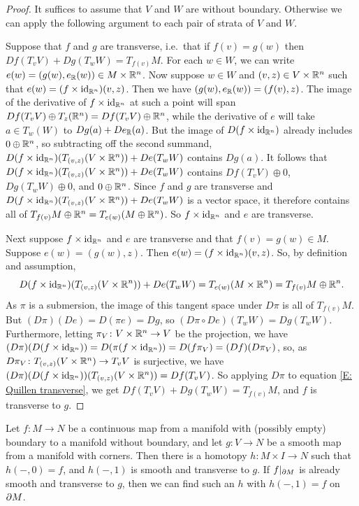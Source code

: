 \begin{proof}
	It suffices to assume that $V$ and $W$ are without boundary.
	Otherwise we can apply the following argument to each pair of strata of $V$ and $W$.

	Suppose that $f$ and $g$ are transverse, i.e.\ that if $f(v)=g(w)$ then $Df(T_vV)+Dg(T_wW)=T_{f(v)}M$.
	For each $w\in W$, we can write $e(w)=(g(w),e_{\mathbb{R}}(w))\in M\times \mathbb{R}^n$.
	Now suppose $w\in W$ and $(v,z)\in V\times \mathbb{R}^n$ such that $e(w)=(f\times\mathrm{id}_{\mathbb{R}^n})(v,z)$.
	Then we have $(g(w),e_{\mathbb{R}}(w))=(f(v),z)$.
	The image of the derivative of $f\times\mathrm{id}_{\mathbb{R}^n}$ at such a point will span $Df(T_vV)\oplus T_z(\mathbb{R}^{n})= Df(T_vV)\oplus \mathbb{R}^{n}$, while the derivative of $e$ will take $a\in T_w(W)$ to $Dg(a)+ De_{\mathbb{R}}(a)$.
	But the image of $D(f\times\mathrm{id}_{\mathbb{R}^n})$ already includes $0\oplus \mathbb{R}^{n}$, so subtracting off the second summand, $D(f\times\mathrm{id}_{\mathbb{R}^{n}})(T_{(v,z)}(V\times \mathbb{R}^n))+De(T_wW)$ contains $Dg(a)$.
	It follows that $D(f\times\mathrm{id}_{\mathbb{R}^{n}})(T_{(v,z)}(V\times \mathbb{R}^n))+De(T_wW)$ contains $Df(T_vV)\oplus 0$, $Dg(T_wW)\oplus 0$, and $0\oplus \mathbb{R}^n$.
	Since $f$ and $g$ are transverse and $D(f\times\mathrm{id}_{\mathbb{R}^{n}})(T_{(v,z)}(V\times \mathbb{R}^n))+De(T_wW)$ is a vector space, it therefore contains all of $T_{f(v)}M\oplus \mathbb{R}^n=T_{e(w)}(M\oplus \mathbb{R}^n)$.
	So $f\times \mathrm{id}_{\mathbb{R}^n}$ and $e$ are transverse.

	Next suppose $f\times \mathrm{id}_{\mathbb{R}^n}$ and $e$ are transverse and that $f(v)=g(w)\in M$.
	Suppose $e(w)=(g(w),z)$.
	Then $e(w)=(f\times \mathrm{id}_{\mathbb{R}^n})(v,z)$.
	So, by definition and assumption,
	\begin{equation}\label{E: Quillen transverse}
		D(f\times\mathrm{id}_{\mathbb{R}^{n}})(T_{(v,z)}(V\times \mathbb{R}^n))+De(T_wW)= T_{e(w)}(M\times \mathbb{R}^n)=T_{f(v)}M\oplus \mathbb{R}^n.
	\end{equation}
	As $\pi$ is a submersion, the image of this tangent space under $D\pi$ is all of $T_{f(v)}M$.
	But $(D\pi)(De)=D(\pi e)=Dg$, so $(D\pi\circ De)(T_wW)=Dg(T_wW)$.
	Furthermore, letting $\pi_V \colon V\times \mathbb{R}^n\to V$ be the projection, we have $(D\pi)(D(f\times\mathrm{id}_{\mathbb{R}^{n}}))=D(\pi(f\times\mathrm{id}_{\mathbb{R}^{n}}))=D(f\pi_V)=(Df)(D\pi_V)$, so, as $D\pi_V \colon T_{(v,z)}(V\times \mathbb{R}^n)\to T_vV$ is surjective, we have $(D\pi)(D(f\times\mathrm{id}_{\mathbb{R}^{n}}))(T_{(v,z)}(V\times \mathbb{R}^n))=Df(T_vV)$.
	So applying $D\pi$ to equation \eqref{E: Quillen transverse}, we get $Df(T_vV)+Dg(T_wW)=T_{f(v)}M$, and $f$ is transverse to $g$.
\end{proof}

\begin{theorem}\label{T: basic trans}
	Let $f \colon M\to N$ be a continuous map from a manifold with (possibly empty) boundary to a manifold without boundary, and let $g \colon V\to N$ be a smooth map from a manifold with corners.
	Then there is a homotopy $h \colon M\times I\to N$ such that $h(-,0)=f$, and $h(-,1)$ is smooth and transverse to $g$.
	If $f|_{\partial M}$ is already smooth and transverse to $g$, then we can find such an $h$ with $h(-,1)=f$ on $\partial M$.
\end{theorem}

